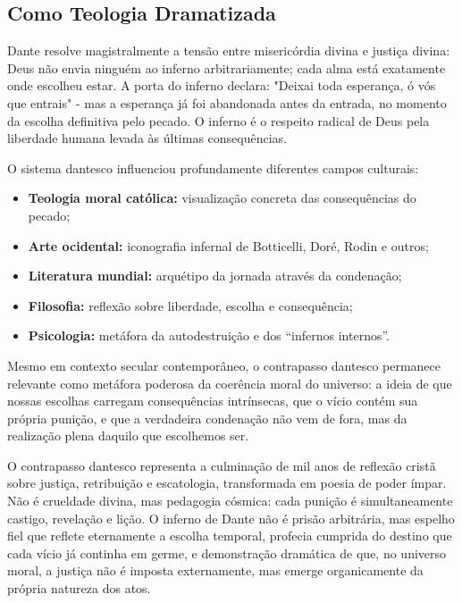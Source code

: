 \subsection{Como Teologia Dramatizada}

Dante resolve magistralmente a tensão entre misericórdia divina e justiça divina: Deus não envia ninguém ao inferno arbitrariamente; cada alma está exatamente onde escolheu estar. A porta do inferno declara: "Deixai toda esperança, ó vós que entrais" - mas a esperança já foi abandonada antes da entrada, no momento da escolha definitiva pelo pecado. O inferno é o respeito radical de Deus pela liberdade humana levada às últimas consequências.


O sistema dantesco influenciou profundamente diferentes campos culturais:

\begin{itemize}
  \item \textbf{Teologia moral católica:} visualização concreta das consequências do pecado;
  \item \textbf{Arte ocidental:} iconografia infernal de Botticelli, Doré, Rodin e outros;
  \item \textbf{Literatura mundial:} arquétipo da jornada através da condenação;
  \item \textbf{Filosofia:} reflexão sobre liberdade, escolha e consequência;
  \item \textbf{Psicologia:} metáfora da autodestruição e dos “infernos internos”.
\end{itemize}

Mesmo em contexto secular contemporâneo, o contrapasso dantesco permanece relevante como metáfora poderosa da coerência moral do universo: a ideia de que nossas escolhas carregam consequências intrínsecas, que o vício contém sua própria punição, e que a verdadeira condenação não vem de fora, mas da realização plena daquilo que escolhemos ser.

O contrapasso dantesco representa a culminação de mil anos de reflexão cristã sobre justiça, retribuição e escatologia, transformada em poesia de poder ímpar. Não é crueldade divina, mas pedagogia cósmica: cada punição é simultaneamente castigo, revelação e lição. O inferno de Dante não é prisão arbitrária, mas espelho fiel que reflete eternamente a escolha temporal, profecia cumprida do destino que cada vício já continha em germe, e demonstração dramática de que, no universo moral, a justiça não é imposta externamente, mas emerge organicamente da própria natureza dos atos.

